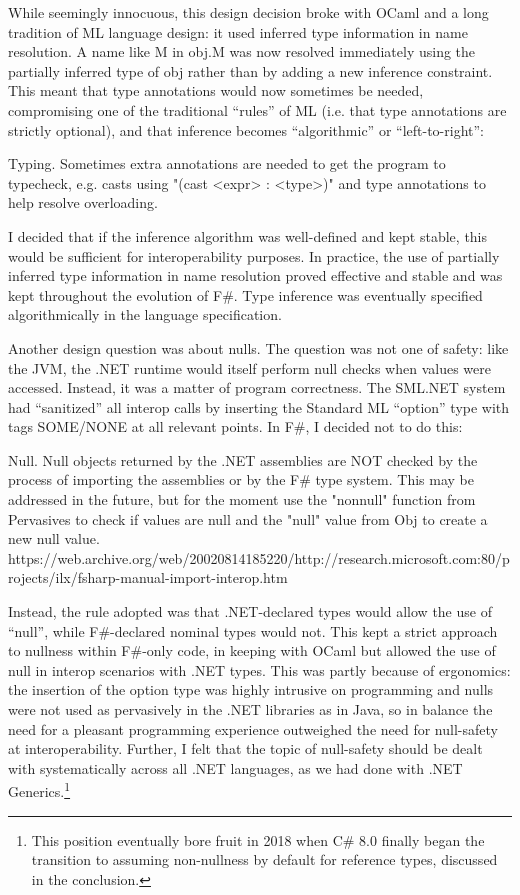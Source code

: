\documentclass[acmsmall,review]{acmart}\settopmatter{printfolios=true,printccs=false,printacmref=false}
\begin{document}
While seemingly innocuous, this design decision broke with OCaml and a long tradition of ML language design: it used inferred type information in name resolution. A name like M in obj.M was now resolved immediately using the partially inferred type of obj rather than by adding a new inference constraint. This meant that type annotations would now sometimes be needed, compromising one of the traditional “rules” of ML (i.e. that type annotations are strictly optional), and that inference becomes “algorithmic” or “left-to-right”:

\begin{verbquote}
Typing. Sometimes extra annotations are needed to get the program to typecheck, e.g. casts using "(cast <expr> : <type>)" and type annotations to help resolve overloading.
\end{verbquote}

I decided that if the inference algorithm was well-defined and kept stable, this would be sufficient for interoperability purposes. In practice, the use of partially inferred type information in name resolution proved effective and stable and was kept throughout the evolution of F\#.  Type inference was eventually specified algorithmically in the language specification. 

Another design question was about nulls. The question was not one of safety: like the JVM, the .NET runtime would itself perform null checks when values were accessed. Instead, it was a matter of program correctness. The SML.NET system had “sanitized” all interop calls by inserting the Standard ML “option” type with tags SOME/NONE at all relevant points.  In F\#, I decided not to do this:
\begin{verbquote}
Null.  Null objects returned by the .NET assemblies are NOT checked by the process of importing the assemblies or by the F\# type system.  This may be addressed in the future, but for the moment use the "nonnull" function from Pervasives to check if values are null and the "null" value from Obj to create a new null value. https://web.archive.org/web/20020814185220/http://research.microsoft.com:80/projects/ilx/fsharp-manual-import-interop.htm
\end{verbquote}
Instead, the rule adopted was that .NET-declared types would allow the use of “null”, while F\#-declared nominal types would not.  This kept a strict approach to nullness within F\#-only code, in keeping with OCaml but allowed the use of null in interop scenarios with .NET types. This was partly because of ergonomics: the insertion of the option type was highly intrusive on programming and nulls were not used as pervasively in the .NET libraries as in Java, so in balance the need for a pleasant programming experience outweighed the need for null-safety at interoperability. Further, I felt that the topic of null-safety should be dealt with systematically across all .NET languages, as we had done with .NET Generics.\footnote{This position eventually bore fruit in 2018 when C\# 8.0 finally began the transition to assuming non-nullness by default for reference types, discussed in the conclusion.}   
\end{document}
